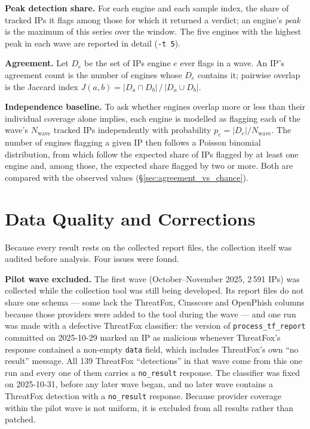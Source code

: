 \textbf{Peak detection share.} For each engine and each sample index, the share of tracked IPs it
flags among those for which it returned a verdict; an engine's \emph{peak} is the maximum of this
series over the window. The five engines with the highest peak in each wave are reported in detail
(\texttt{-t 5}).

\textbf{Agreement.} Let $D_e$ be the set of IPs engine $e$ ever flags in a wave. An IP's agreement
count is the number of engines whose $D_e$ contains it; pairwise overlap is the Jaccard index
$J(a,b) = |D_a \cap D_b| \,/\, |D_a \cup D_b|$.

\textbf{Independence baseline.} To ask whether engines overlap more or less than their individual
coverage alone implies, each engine is modelled as flagging each of the wave's $N_{\text{wave}}$
tracked IPs independently with probability $p_e = |D_e| / N_{\text{wave}}$. The number of engines
flagging a given IP then follows a Poisson binomial distribution, from which follow the expected
share of IPs flagged by at least one engine and, among those, the expected share flagged by two or
more. Both are compared with the observed values (\S\ref{sec:agreement_vs_chance}).

\section{Data Quality and Corrections}
\label{sec:data_quality}

Because every result rests on the collected report files, the collection itself was audited before
analysis. Four issues were found.

\textbf{Pilot wave excluded.} The first wave (October--November 2025, 2\,591 IPs) was collected while
the collection tool was still being developed. Its report files do not share one schema --- some
lack the ThreatFox, Cinsscore and OpenPhish columns because those providers were added to the tool during the wave
--- and one run was made with a defective ThreatFox classifier: the version of
\texttt{process\_tf\_report} committed on 2025-10-29 marked an IP as malicious whenever ThreatFox's
response contained a non-empty \texttt{data} field, which includes ThreatFox's own ``no result''
message. All 139 ThreatFox ``detections'' in that wave come from this one run and every one of them
carries a \texttt{no\_result} response. The classifier was fixed on 2025-10-31, before any later
wave began, and no later wave contains a ThreatFox detection with a \texttt{no\_result} response.
Because provider coverage within the pilot wave is not uniform, it is excluded from all results
rather than patched.

